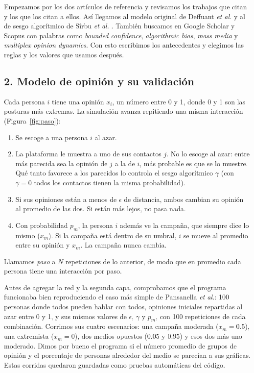 \documentclass[11pt]{article}
\begin{document}
Empezamos por los dos artículos de referencia y revisamos los trabajos que citan y los que los citan
a ellos. Así llegamos al modelo original de Deffuant \emph{et al.} \cite{Deffuant2000} y al de sesgo
algorítmico de Sîrbu \emph{et al.} \cite{Sirbu2019}. También buscamos en Google Scholar y Scopus
con palabras como \emph{bounded confidence}, \emph{algorithmic bias}, \emph{mass media} y
\emph{multiplex opinion dynamics}. Con esto escribimos los antecedentes y elegimos las reglas y los
valores que usamos después.

\subsection*{2. Modelo de opinión y su validación}

Cada persona $i$ tiene una opinión $x_i$, un número entre 0 y 1, donde 0 y 1 son las posturas más
extremas. La simulación avanza repitiendo una misma interacción (Figura~\ref{fig:paso}):

\begin{enumerate}
	\item Se escoge a una persona $i$ al azar.

	\item La plataforma le muestra a uno de sus contactos $j$. No lo escoge al azar: entre más
	      parecida sea la opinión de $j$ a la de $i$, más probable es que se lo muestre. Qué tanto
	      favorece a los parecidos lo controla el sesgo algorítmico $\gamma$ (con $\gamma=0$ todos los
	      contactos tienen la misma probabilidad).

	\item Si sus opiniones están a menos de $\epsilon$ de distancia, ambos cambian su opinión al
	      promedio de las dos. Si están más lejos, no pasa nada.

	\item Con probabilidad $p_m$, la persona $i$ además ve la campaña, que siempre dice lo mismo
	      ($x_m$). Si la campaña está dentro de su umbral, $i$ se mueve al promedio entre su opinión y
	      $x_m$. La campaña nunca cambia.
\end{enumerate}

Llamamos \emph{paso} a $N$ repeticiones de lo anterior, de modo que en promedio cada persona tiene
una interacción por paso.

Antes de agregar la red y la segunda capa, comprobamos que el programa funcionaba bien
reproduciendo el caso más simple de Pansanella \emph{et al.}: 100 personas donde todos pueden hablar
con todos, opiniones iniciales repartidas al azar entre 0 y 1, y sus mismos valores de $\epsilon$,
$\gamma$ y $p_m$, con 100 repeticiones de cada combinación. Corrimos sus cuatro escenarios: una
campaña moderada ($x_m=0.5$), una extremista ($x_m=0$), dos medios opuestos ($0.05$ y $0.95$) y esos
dos más uno moderado. Dimos por bueno el programa si el número promedio de grupos de opinión y el
porcentaje de personas alrededor del medio se parecían a sus gráficas. Estas corridas quedaron
guardadas como pruebas automáticas del código.
\end{document}
